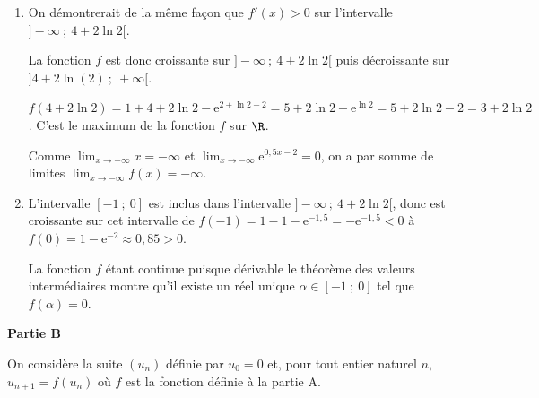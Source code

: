 \begin{enumerate}
\begin{enumerate}
$f'(x) = 1 - 0,5\text{e}^{0,5x - 2}$.
		\item %
On a dans $\R$,

$f'(x) < 0 \iff 1 - 0,5\text{e}^{0,5x - 2} < 0 \iff 1 < 0,5\text{e}^{0,5x - 2} \iff 2 < \text{e}^{0,5x - 2}$. par croissance sur $\R_{+}^*$ de la fonction logarithme népérien $ \ln 2 < 0,5x - 2 \iff 2 + \ln 2 < 0,5x \iff 4 + 2\ln 2 < x$.

Conclusion : $S = ]4 + 2\ln (2)~;~+\infty[$
	\end{enumerate}
\item %
On démontrerait de la même façon que $f'(x) > 0$ sur l'intervalle $]- \infty~;~4 + 2\ln 2[$.

La fonction $f$ est donc croissante sur $]- \infty~;~4 + 2\ln 2[$ puis décroissante sur $]4 + 2\ln (2)~;~+\infty[$.

$f\left(4 + 2\ln 2 \right) = 1 + 4 + 2\ln 2 - \text{e}^{2 + \ln 2 - 2} = 5 + 2\ln 2 - \text{e}^{\ln 2} = 5 + 2\ln 2 - 2 = 3 + 2\ln 2$. C'est le maximum de la fonction $f$ sur $\R$.

Comme $\displaystyle\lim_{x \to - \infty} x = - \infty$ et $\displaystyle\lim_{x \to - \infty} \text{e}^{0,5x - 2} = 0$, on a par somme de limites  $\displaystyle\lim_{x \to - \infty} f(x) = - \infty$.
\item %
L'intervalle $[-1~;~0]$ est inclus dans l'intervalle $]- \infty~;~4 + 2\ln 2[$, donc est croissante sur cet intervalle de $f(-1) = 1 - 1 - \text{e}^{-1,5} = - \text{e}^{-1,5} < 0$ à $f(0) = 1 - \text{e}^{-2} \approx 0,85 > 0$.

La fonction $f$ étant continue puisque dérivable le théorème des valeurs intermédiaires montre qu'il existe un réel unique $\alpha \in[-1~;~0]$ tel que $f(\alpha) = 0$.
\end{enumerate}

\bigskip

\textbf{Partie B}

\medskip

On considère la suite $\left(u_n\right)$ définie par $u_0 = 0$ et, pour tout entier naturel $n$,
\: $u_{n+1} = f\left(u_n\right)$ où $f$ est la fonction définie à la partie A.

